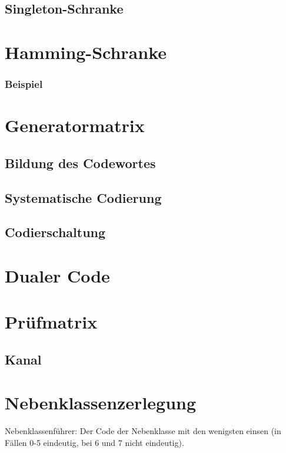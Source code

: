 \subsection{Singleton-Schranke}

\section{Hamming-Schranke}
\subsubsection*{Beispiel}

\section{Generatormatrix}
\subsection{Bildung des Codewortes}
\subsection{Systematische Codierung}
\subsection{Codierschaltung}

\section{Dualer Code}

\section{Prüfmatrix}
\subsection*{Kanal}

\section{Nebenklassenzerlegung}
Nebenklassenführer: Der Code der Nebenklasse mit den wenigsten einsen (in Fällen 0-5 eindeutig, bei 6 und 7 nicht eindeutig).
